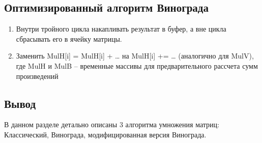 	\subsection{Оптимизированный алгоритм Винограда}
	
	\begin{enumerate}
		\item Внутри тройного цикла накапливать результат в буфер, а вне цикла сбрасывать его в ячейку матрицы.
		\item Заменить MulH[i] = MulH[i] + … на MulH[i] += … (аналогично для MulV),
		где MulH и MulB – временные массивы для предварительного рассчета сумм произведений
		
	\end{enumerate}

	\subsection{Вывод}
	
	В данном разделе детально описаны 3 алгоритма умножения матриц: Классический, Винограда, модифицированная версия Винограда.
	
	\newpage
	